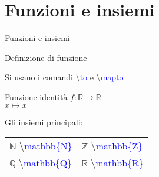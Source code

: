 \section{Funzioni e insiemi}
  \begin{frame}{Funzioni e insiemi}

	Definizione di funzione

	Si usano i comandi \textbackslash \textcolor{blue}{to} e \textbackslash \textcolor{blue}{mapto}

    \begin{exampleblock}{Funzione identità}
	  \centering
	  $f \colon \mathbb{R} \to \mathbb{R}$ \\
	  $x \mapsto x$
    \end{exampleblock}

	Gli insiemi principali:

	\begin{table}[h!]
	\begin{tabular}{l l}
	\hline
	$\mathbb{N}$ \textbackslash \textcolor{blue}{mathbb\{N\}} & $\mathbb{Z}$ \textbackslash \textcolor{blue}{mathbb\{Z\}} \\
	$\mathbb{Q}$ \textbackslash \textcolor{blue}{mathbb\{Q\}} & $\mathbb{R}$ \textbackslash \textcolor{blue}{mathbb\{R\}} \\
	\hline
	\end{tabular}
	\end{table}

\end{frame}
